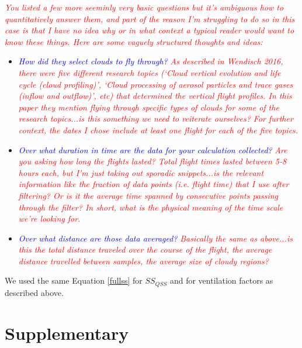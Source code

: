 \documentclass{article}
\newcommand{\drcomm}[1]{\textcolor{blue}{\textit{#1}}}
\newcommand{\klcomm}[1]{\textcolor{red}{\textit{#1}}}
\begin{document}
\klcomm{You listed a few more seeminly very basic questions but it's ambiguous how to quantitatively answer them, and part of the reason I'm struggling to do so in this case is that I have no idea why or in what context a typical reader would want to know these things. Here are some vaguely structured thoughts and ideas:}
\begin{itemize}
\item \drcomm{How did they select clouds to fly through?} \klcomm{As described in Wendisch 2016, there were five different research topics (`Cloud vertical evolution and life cycle (cloud profiling)', `Cloud processing of aerosol particles and trace gases (inflow and outflow)', etc) that determined the vertical flight profiles. In this paper they mention flying through specific types of clouds for some of the research topics...is this something we need to reiterate ourselves? For further context, the dates I chose include at least one flight for each of the five topics.}
\item \drcomm{Over what duration in time are the data for your calculation collected?} \klcomm{Are you asking how long the flights lasted? Total flight times lasted between 5-8 hours each, but I'm just taking out sporadic snippets...is the relevant information like the fraction of data points (i.e. flight time) that I use after filtering? Or is it the average time spanned by consecutive points passing through the filter? In short, what is the physical meaning of the time scale we're looking for.}
\item \drcomm{Over what distance are those data averaged?} \klcomm{Basically the same as above...is this the total distance traveled over the course of the flight, the average distance travelled between samples, the average size of cloudy regions?}
\end{itemize}

We used the same Equation \ref{fullss} for $SS_{QSS}$ and for ventilation factors as described above.

\clearpage
\newpage

\section{Supplementary}
\end{document}
